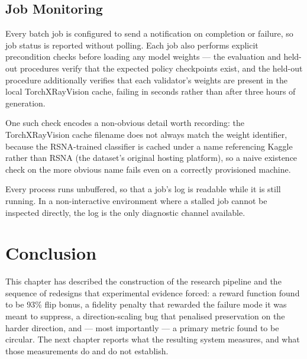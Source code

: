 \subsection{Job Monitoring}

Every batch job is configured to send a notification on completion or
failure, so job status is reported without polling. Each job also
performs explicit precondition checks before loading any model weights
--- the evaluation and held-out procedures verify that the expected
policy checkpoints exist, and the held-out procedure additionally
verifies that each validator's weights are present in the local
TorchXRayVision cache, failing in seconds rather than after three hours
of generation.

One such check encodes a non-obvious detail worth recording: the
TorchXRayVision cache filename does not always match the weight
identifier, because the RSNA-trained classifier is cached under a name
referencing Kaggle rather than RSNA (the dataset's original hosting
platform), so a naive existence check on the more obvious name fails even
on a correctly provisioned machine.

Every process runs unbuffered, so that a job's log is readable while it
is still running. In a non-interactive environment where a stalled job
cannot be inspected directly, the log is the only diagnostic channel
available.

\section{Conclusion}

This chapter has described the construction of the research pipeline and
the sequence of redesigns that experimental evidence forced: a reward
function found to be 93\% flip bonus, a fidelity penalty that rewarded
the failure mode it was meant to suppress, a direction-scaling bug that
penalised preservation on the harder direction, and --- most importantly
--- a primary metric found to be circular. The next chapter reports what
the resulting system measures, and what those measurements do and do not
establish.
